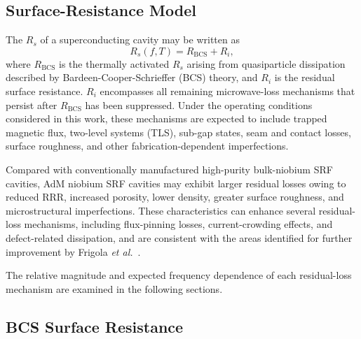 \documentclass[
  aps,
  physrev,
  reprint,
  superscriptaddress,
  nofootinbib,
  amsmath,
  amssymb
]{revtex4-2}
\begin{document}
\subsection[\appendixname~\thesubsection]{Surface-Resistance Model}
\label{app:Rs_model}

The $R_s$ of a superconducting cavity may be written as~\cite{Gurevich2012}
\begin{equation}
    R_s(f,T)=R_{\mathrm{BCS}}+R_i,
    \label{eq:Rs_decomp}
\end{equation}
where $R_{\mathrm{BCS}}$ is the thermally activated $R_s$ arising from quasiparticle dissipation described by Bardeen-Cooper-Schrieffer (BCS) theory, and $R_i$ is the residual surface resistance. $R_i$ encompasses all remaining microwave-loss mechanisms that persist after $R_{\mathrm{BCS}}$ has been suppressed. Under the operating conditions considered in this work, these mechanisms are expected to include trapped magnetic flux, two-level systems (TLS), sub-gap states, seam and contact losses, surface roughness, and other fabrication-dependent imperfections.

Compared with conventionally manufactured high-purity bulk-niobium SRF cavities, AdM niobium SRF cavities may exhibit larger residual losses owing to reduced RRR, increased porosity, lower density, greater surface roughness, and microstructural imperfections. These characteristics can enhance several residual-loss mechanisms, including flux-pinning losses, current-crowding effects, and defect-related dissipation, and are consistent with the areas identified for further improvement by Frigola \textit{et al.}~\cite{Frigola2015}.

The relative magnitude and expected frequency dependence of each residual-loss mechanism are examined in the following sections.

\subsection[\appendixname~\thesubsection]{BCS Surface Resistance}
\label{app:Rs_BCS}
\end{document}
